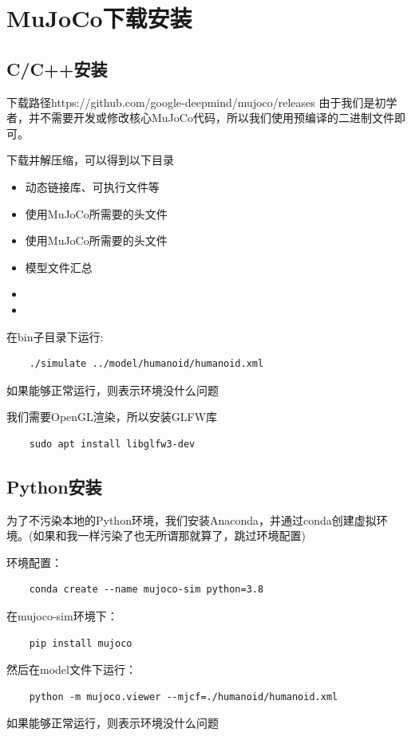 \chapter{MuJoCo下载安装}
\section{C/C++安装}
下载路径https://github.com/google-deepmind/mujoco/releases
由于我们是初学者，并不需要开发或修改核心MuJoCo代码，所以我们使用预编译的二进制文件即可。

下载并解压缩，可以得到以下目录
\begin{itemize}
	\item[bin:] 动态链接库、可执行文件等
	\item[include:] 使用MuJoCo所需要的头文件
	\item[lib:] 使用MuJoCo所需要的头文件
	\item[model:] 模型文件汇总
	\item[sample:]
	\item[simulate:]  
\end{itemize}
在bin子目录下运行:
\begin{lstlisting}
	./simulate ../model/humanoid/humanoid.xml
\end{lstlisting}
如果能够正常运行，则表示环境没什么问题

我们需要OpenGL渲染，所以安装GLFW库
\begin{lstlisting}
	sudo apt install libglfw3-dev
\end{lstlisting}

\section{Python安装}
为了不污染本地的Python环境，我们安装Anaconda，并通过conda创建虚拟环境。(如果和我一样污染了也无所谓那就算了，跳过环境配置)

环境配置：
\begin{lstlisting}
	conda create --name mujoco-sim python=3.8
\end{lstlisting}

在mujoco-sim环境下：
\begin{lstlisting}
	pip install mujoco
\end{lstlisting}

然后在model文件下运行：
\begin{lstlisting}
	python -m mujoco.viewer --mjcf=./humanoid/humanoid.xml
\end{lstlisting}
如果能够正常运行，则表示环境没什么问题